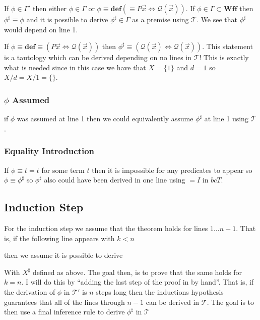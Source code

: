 \documentclass[12pt]{article}
\newcommand{\bv}[1]{\boldsymbol{#1}}
\newcommand{\mc}[1]{\mathcal{#1}}
\newcommand{\bc}[1]{\bv{\mc{#1}}}
\begin{document}
If $\phi \in \Gamma'$ then either $\phi \in \Gamma$ or $\phi \equiv \textbf{def} (\equiv P\vec{x} \iff \mc{Q}(\vec{x}))$. If $\phi \in \Gamma \subset \textbf{Wff}$ then $\phi^{\sharp} \equiv \phi$ and it is possible to derive $\phi^{\sharp} \in \Gamma$ as a premise using $\bc{T}$. We see that $\phi^{\sharp}$ would depend on line 1.

If $\phi\equiv \textbf{def}\equiv(P\vec{x}\iff \mc{Q}(\vec{x}))$ then $\phi^{\sharp} \equiv (\mc{Q}(\vec{x})\iff\mc{Q}(\vec{x}))$. This statement is a tautology which can be derived depending on no lines in $\mc{T}$! This is exactly what is needed since in this case we have that $X=\{1\}$ and $d=1$ so $X/d = X/1 = \{\}$.

\subsubsection*{$\phi$ Assumed}

if $\phi$ was assumed at line 1 then we could equivalently assume $\phi^{\sharp}$ at line 1 using $\bc{T}$.

\subsubsection*{Equality Introduction}

If $\phi\equiv t=t$ for some term $t$ then it is impossible for any predicates to appear so $\phi \equiv \phi^{\sharp}$ so $\phi^{\sharp}$ also could have been derived in one line using $=I$ in $bc{T}$.

\subsection{Induction Step}

For the induction step we assume that the theorem holds for lines $1\ldots n-1$. That is, if the following line appears with $k < n$

\begin{ND}[][][][][.6\linewidth]
\end{ND}

then we assume it is possible to derive

\begin{ND}[][][][][.6\linewidth]
\end{ND}

With $X^{\sharp}$ defined as above. The goal then, is to prove that the same holds for $k=n$. I will do this by ``adding the last step of the proof in by hand''. That is, if the derivation of $\phi$ in $\bc{T}'$ is $n$ steps long then the inductions hypothesis guarantees that all of the lines through $n-1$ can be derived in $\bc{T}$. The goal is to then use a final inference rule to derive $\phi^{\sharp}$ in $\bc{T}$
\end{document}
